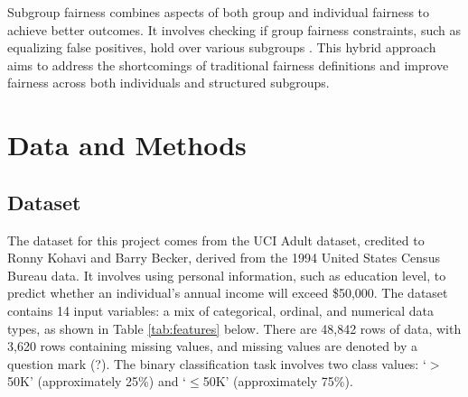 \documentclass[conference]{IEEEtran}
\begin{document}
Subgroup fairness combines aspects of both group and individual fairness to achieve better outcomes. It involves checking if group fairness constraints, such as equalizing false positives, hold over various subgroups \cite{kearns2019empirical}. This hybrid approach aims to address the shortcomings of traditional fairness definitions and improve fairness across both individuals and structured subgroups.
\section{Data and Methods}
\subsection{Dataset}
The dataset for this project comes from the UCI Adult dataset, credited to Ronny Kohavi and Barry Becker, derived from the 1994 United States Census Bureau data. It involves using personal information, such as education level, to predict whether an individual's annual income will exceed \$50,000. The dataset contains 14 input variables: a mix of categorical, ordinal, and numerical data types, as shown in Table \ref{tab:features} below. There are 48,842 rows of data, with 3,620 rows containing missing values, and missing values are denoted by a question mark (?). The binary classification task involves two class values: `$>$50K' (approximately 25\%) and `$\leq$50K' (approximately 75\%).
\end{document}
